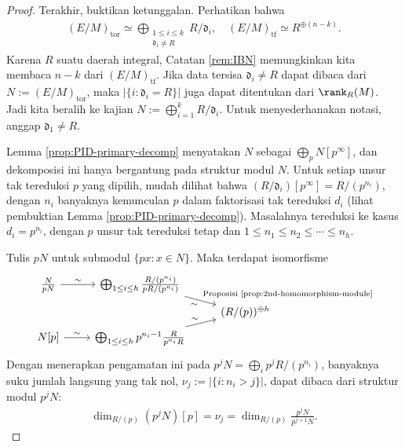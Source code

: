 \begin{proof}
	Terakhir, buktikan ketunggalan. Perhatikan bahwa
	\begin{gather*}
		(E/M)_\text{tor} \simeq \bigoplus_{\substack{1 \leq i \leq k \\ \mathfrak{d}_i \neq R}} R/\mathfrak{d}_i, \quad (E/M)_\text{tf} \simeq R^{\oplus (n-k)}.
	\end{gather*}
	Karena $R$ suatu daerah integral, Catatan \ref{rem:IBN} memungkinkan kita membaca $n-k$ dari $(E/M)_\text{tf}$. Jika data tersisa $\mathfrak{d}_i \neq R$ dapat dibaca dari $N := (E/M)_\text{tor}$, maka $|\{i: \mathfrak{d}_i = R \}|$ juga dapat ditentukan dari $\rank_R(M)$. Jadi kita beralih ke kajian $N := \bigoplus_{i=1}^k R/\mathfrak{d}_i$. Untuk menyederhanakan notasi, anggap $\mathfrak{d}_1 \neq R$.

	Lemma \ref{prop:PID-primary-decomp} menyatakan $N$ sebagai $\bigoplus_p N[p^\infty]$, dan dekomposisi ini hanya bergantung pada struktur modul $N$. Untuk setiap unsur tak tereduksi $p$ yang dipilih, mudah dilihat bahwa $(R/\mathfrak{d}_i)[p^\infty] = R/(p^{n_i})$, dengan $n_i$ banyaknya kemunculan $p$ dalam faktorisasi tak tereduksi $d_i$ (lihat pembuktian Lemma \ref{prop:PID-primary-decomp}). Masalahnya tereduksi ke kasus $d_i = p^{n_i}$, dengan $p$ unsur tak tereduksi tetap dan $1 \leq n_1 \leq n_2 \leq \cdots \leq n_h$.
	
	Tulis $pN$ untuk submodul $\{px: x \in N\}$. Maka terdapat isomorfisme
	\[\begin{tikzcd}[row sep=tiny]
		\frac{N}{pN} \arrow[r, "\sim"] & \bigoplus_{1 \leq i \leq h} \frac{R/(p^{n_i})}{pR/(p^{n_i})} \arrow[rd, "\sim"', "\text{Proposisi \ref{prop:2nd-homomorphism-module}}"] & \\
		& & (R/(p))^{\oplus h} \\
		N[p] \arrow[r, "\sim"] & \bigoplus_{1 \leq i \leq h} p^{n_i - 1} \frac{R}{p^{n_i} R} \arrow[ru, "\sim"] & 
	\end{tikzcd}\]
	Dengan menerapkan pengamatan ini pada $p^j N = \bigoplus_i p^j R/(p^{n_i})$, banyaknya suku jumlah langsung yang tak nol, $\nu_j := |\{i: n_i > j\}|$, dapat dibaca dari struktur modul $p^j N$:
	\begin{gather}\label{eqn:PID-decomp-nu_j}
		\dim_{R/(p)} (p^j N)[p] = \nu_j = \dim_{R/(p)} \frac{p^j N}{p^{j+1} N}.
	\end{gather}


\end{proof}

